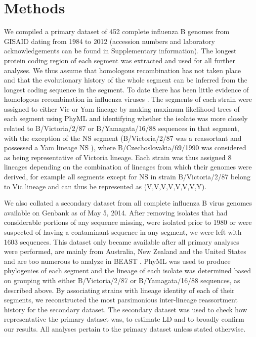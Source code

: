 \documentclass[11pt,oneside,letterpaper]{article}
\begin{document}
\section*{Methods}
We compiled a primary dataset of 452 complete influenza B genomes from GISAID \citep{GISAID} dating from 1984 to 2012 (accession numbers and laboratory acknowledgements can be found in Supplementary information).
The longest protein coding region of each segment was extracted and used for all further analyses.
We thus assume that homologous recombination has not taken place and that the evolutionary history of the whole segment can be inferred from the longest coding sequence in the segment.
To date there has been little evidence of homologous recombination in influenza viruses \citep{chare2003,boni2008,han2010}.
The segments of each strain were assigned to either Vic or Yam lineage by making maximum likelihood trees of each segment using PhyML \citep{guindon2003} and identifying whether the isolate was more closely related to B/Victoria/2/87 or B/Yamagata/16/88 sequences in that segment, with the exception of the NS segment (B/Victoria/2/87 was a reassortant and possessed a Yam lineage NS \citep{lindstrom1999}), where B/Czechoslovakia/69/1990 was considered as being representative of Victoria lineage.
Each strain was thus assigned 8 lineages depending on the combination of lineages from which their genomes were derived, for example all segments except for NS in strain B/Victoria/2/87 belong to Vic lineage and can thus be represented as (V,V,V,V,V,V,V,Y).

We also collated a secondary dataset from all complete influenza B virus genomes available on Genbank as of May 5, 2014.
After removing isolates that had considerable portions of any sequence missing, were isolated prior to 1980 or were suspected of having a contaminant sequence in any segment, we were left with 1603 sequences.
This dataset only became available after all primary analyses were performed, are mainly from Australia, New Zealand and the United States and are too numerous to analyze in BEAST \citep{drummond2012}.
PhyML \citep{guindon2003} was used to produce phylogenies of each segment and the lineage of each isolate was determined based on grouping with either B/Victoria/2/87 or B/Yamagata/16/88 sequences, as described above.
By associating strains with lineage identity of each of their segments, we reconstructed the most parsimonious inter-lineage reassortment history for the secondary dataset.
The secondary dataset was used to check how representative the primary dataset was, to estimate LD and to broadly confirm our results.
All analyses pertain to the primary dataset unless stated otherwise.
\end{document}
